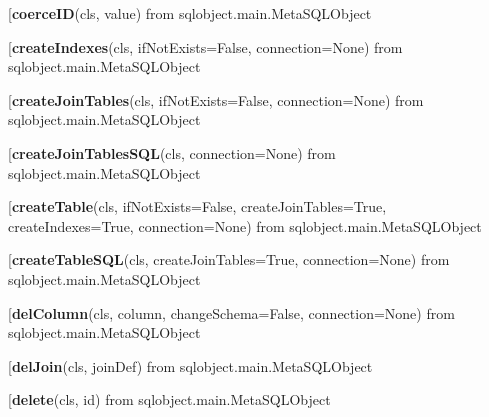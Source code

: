 \begin{description}\item[{\bf coerceID}(cls, value) from sqlobject.main.MetaSQLObject\end{description}

\begin{description}\item[{\bf createIndexes}(cls, ifNotExists=False, connection=None) from sqlobject.main.MetaSQLObject\end{description}

\begin{description}\item[{\bf createJoinTables}(cls, ifNotExists=False, connection=None) from sqlobject.main.MetaSQLObject\end{description}

\begin{description}\item[{\bf createJoinTablesSQL}(cls, connection=None) from sqlobject.main.MetaSQLObject\end{description}

\begin{description}\item[{\bf createTable}(cls, ifNotExists=False, createJoinTables=True, createIndexes=True, connection=None) from sqlobject.main.MetaSQLObject\end{description}

\begin{description}\item[{\bf createTableSQL}(cls, createJoinTables=True, connection=None) from sqlobject.main.MetaSQLObject\end{description}

\begin{description}\item[{\bf delColumn}(cls, column, changeSchema=False, connection=None) from sqlobject.main.MetaSQLObject\end{description}

\begin{description}\item[{\bf delJoin}(cls, joinDef) from sqlobject.main.MetaSQLObject\end{description}

\begin{description}\item[{\bf delete}(cls, id) from sqlobject.main.MetaSQLObject\end{description}

